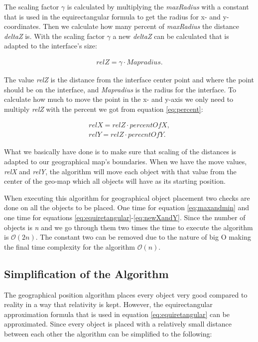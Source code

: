 The scaling factor \textit{$\gamma$} is calculated by multiplying the \textit{maxRadius} with a constant that is used in the equirectangular formula to get the radius for x- and y-coordinates. Then we calculate how many percent of \textit{maxRadius} the distance \textit{deltaZ} is. With the scaling factor \textit{$\gamma$} a new \textit{deltaZ} can be calculated that is adapted to the interface's size:

\begin{align}
\label{eq:newZ}
relZ = \gamma \cdot Mapradius.
\end{align}

The value \textit{relZ} is the distance from the interface center point and where the point should be on the interface, and \textit{Mapradius} is the radius for the interface. To calculate how much to move the point in the x- and y-axis we only need to multiply \textit{relZ} with the percent we got from equation \ref{eq:percent}:

\begin{align}
\label{eq:newXandY}
relX = relZ \cdot percentOfX, \\
relY = relZ \cdot perecntOfY. \nonumber
\end{align}

What we basically have done is to make sure that scaling of the distances is adapted to our geographical map's boundaries. When we have the move values, \textit{relX} and \textit{relY}, the algorithm will move each object with that value from the center of the geo-map which all objects will have as its starting position. 

When executing this algorithm for geographical object placement two checks are done on all the objects to be placed. One time for equation \ref{eq:maxandmin} and one time for equations \ref{eq:equiretangular}-\ref{eq:newXandY}. Since the number of objects is \textit{n} and we go through them two times the time to execute the algorithm is $\mathcal{O}(2n)$. The constant two can be removed due to the nature of big O making the final time complexity for the algorithm $\mathcal{O}(n)$.



\subsection{Simplification of the Algorithm}
\label{sec:limacc}

The geographical position algorithm places every object very good compared to reality in a way that relativity is kept. However, the equirectangular approximation formula that is used in equation \ref{eq:equiretangular} can be approximated. Since every object is placed with a relatively small distance between each other the algorithm can be simplified to the following: 

